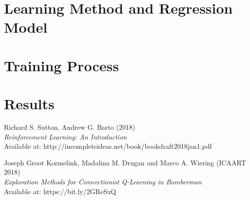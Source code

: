 \documentclass[12pt]{report}
\begin{document}

\tableofcontents
\pagebreak

\renewcommand{\thesection}{\arabic{section}}

\section{Learning Method and Regression Model}

	
\section{Training Process}


\section{Results}
\label{results}



\begin{thebibliography}{111}
   



Richard S. Sutton, Andrew G. Barto (2018)\\
\textit{Reinforcement Learning: An Introduction}\\
Available at: http://incompleteideas.net/book/bookdraft2018jan1.pdf

Joseph Groot Kormelink, Madalina M. Drugan and Marco A. Wiering (ICAART 2018)\\
\textit{Exploration Methods for Connectionist Q-Learning in Bomberman}\\
Available at: https://bit.ly/2GReSxQ
\end{thebibliography}
\end{document}
